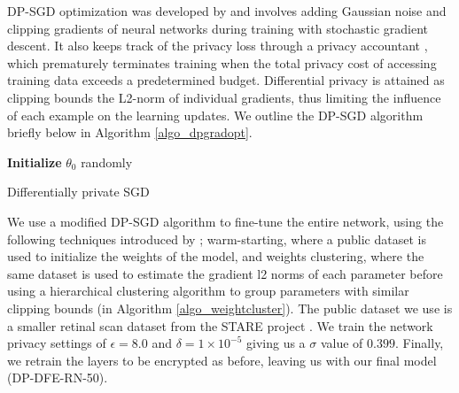 \documentclass[conference]{IEEEtran}
\begin{document}
DP-SGD optimization was developed by \cite{abadi2016dpsgd} and involves adding Gaussian noise and clipping gradients of neural networks during training with stochastic gradient descent. It also keeps track of the privacy loss through a privacy accountant \cite{mcsherry2009privacyaccounting}, which prematurely terminates training when the total privacy cost of accessing training data exceeds a predetermined budget. Differential privacy is attained as clipping bounds the L2-norm of individual gradients, thus limiting the influence of each example on the learning updates.  We outline the DP-SGD algorithm briefly below in Algorithm \ref{algo_dpgradopt}.

\begin{algorithm}
\textbf{Initialize} $\theta_0$ randomly\;
\caption{Differentially private SGD}\label{algo_dpgradopt}
\end{algorithm}\DecMargin{1em}


We use a modified DP-SGD algorithm \cite{abadi2016dpsgd} to fine-tune the entire network, using the following techniques introduced by \cite{zhang2018privatereleasing}; warm-starting, where a public dataset is used to initialize the weights of the model, and weights clustering, where the same dataset is used to estimate the gradient l2 norms of each parameter before using a hierarchical clustering algorithm to group parameters with similar clipping bounds (in Algorithm \ref{algo_weightcluster}).  The public dataset we use is a smaller retinal scan dataset from the STARE project \cite{hoover2000stare}.  We train the network privacy settings of $\epsilon=8.0$ and $\delta=1\times10^{-5}$ giving us a $\sigma$ value of $0.399$.  Finally, we retrain the layers to be encrypted as before, leaving us with our final model (DP-DFE-RN-50).
\end{document}
